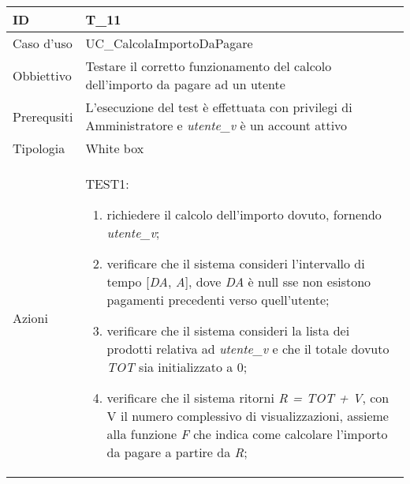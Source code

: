 \begin{table}[hb]
    \centering
    \begin{tabular}{ |p{2cm}|p{10cm}|  }
        \hline
        ID          & T\_11                                                                                                     \\\hline
        Caso d'uso  & UC\_CalcolaImportoDaPagare                                                                                \\\hline
        Obbiettivo  & Testare il corretto funzionamento del calcolo dell'importo da pagare ad un utente                         \\\hline
        Prerequsiti & L'esecuzione del test è effettuata con privilegi di Amministratore e \emph{utente\_v} è un account attivo \\\hline
        Tipologia   & White box                                                                                                 \\\hline
        Azioni      &
        TEST1:
        \begin{enumerate}[nosep, topsep=0pt]
            \item richiedere il calcolo dell'importo dovuto, fornendo \emph{utente\_v};
            \item verificare che il sistema consideri l'intervallo di tempo [\emph{DA}, \emph{A}], dove \emph{DA} è null sse non esistono pagamenti precedenti verso quell'utente;
            \item verificare che il sistema consideri la lista dei prodotti relativa ad \emph{utente\_v} e che il totale dovuto \emph{TOT} sia initializzato a 0;
            \item verificare che il sistema ritorni \emph{R = TOT + V}, con V il numero complessivo di visualizzazioni, assieme alla funzione \emph{F} che indica come calcolare l'importo da pagare a partire da \emph{R};
        \end{enumerate}
        \\\hline
    \end{tabular}
\end{table}


